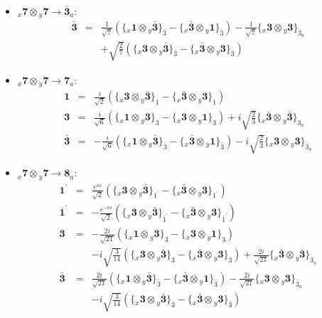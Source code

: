 \documentclass[english]{article}
\newcommand{\rep}[1]{\mathbf{#1}}
\newcommand{\repx}[2]{{}_{#2}\mathbf{#1}}
\newcommand{\subcg}[3]{\big\{ \repx{#1}{x}\otimes\repx{#2}{y}\big\}^{}_{#3}}
\begin{document}
\begin{itemize}
\begin{eqnarray*}
\end{eqnarray*}
\item $\repx{7}{x}\otimes\repx{7}{y}\to\rep{\bar{3}}_{a}$:
\begin{eqnarray*}
\rep{\bar{3}} &=& \frac{1}{\sqrt{7}}\left(\subcg{1}{\bar{3}}{\bar{3}}-\subcg{\bar{3}}{1}{\bar{3}}\right)-\frac{1}{\sqrt{7}}\subcg{3}{3}{\bar{3}_{a}} \\ 
 & & +\sqrt{\frac{2}{7}}\left(\subcg{3}{\bar{3}}{\bar{3}}-\subcg{\bar{3}}{3}{\bar{3}}\right)
\end{eqnarray*}
\item $\repx{7}{x}\otimes\repx{7}{y}\to\rep{7}_{a}$:
\begin{eqnarray*}
\rep{1} &=& \frac{i}{\sqrt{2}}\left(\subcg{3}{\bar{3}}{1}-\subcg{\bar{3}}{3}{1}\right)
\\
\rep{3} &=& \frac{i}{\sqrt{6}}\left(\subcg{1}{3}{3}-\subcg{3}{1}{3}\right)+i \sqrt{\frac{2}{3}}\subcg{\bar{3}}{\bar{3}}{3_{a}}
\\
\rep{\bar{3}} &=& -\frac{i}{\sqrt{6}}\left(\subcg{1}{\bar{3}}{\bar{3}}-\subcg{\bar{3}}{1}{\bar{3}}\right)-i \sqrt{\frac{2}{3}}\subcg{3}{3}{\bar{3}_{a}}
\end{eqnarray*}
\item $\repx{7}{x}\otimes\repx{7}{y}\to\rep{8}_{a}$:
\begin{eqnarray*}
\rep{1^{\prime}} &=& \frac{e^{i \alpha }}{\sqrt{2}}\left(\subcg{3}{\bar{3}}{1^{\prime}}-\subcg{\bar{3}}{3}{1^{\prime}}\right)
\\
\rep{\bar{1}^{\prime}} &=& -\frac{e^{-i \alpha }}{\sqrt{2}}\left(\subcg{3}{\bar{3}}{\bar{1}^{\prime}}-\subcg{\bar{3}}{3}{\bar{1}^{\prime}}\right)
\\
\rep{3} &=& -\frac{2 i}{\sqrt{21}}\left(\subcg{1}{3}{3}-\subcg{3}{1}{3}\right) \\ 
 & & -i \sqrt{\frac{3}{14}}\left(\subcg{3}{\bar{3}}{3}-\subcg{\bar{3}}{3}{3}\right)+\frac{2 i}{\sqrt{21}}\subcg{\bar{3}}{\bar{3}}{3_{a}}
\\
\rep{\bar{3}} &=& \frac{2 i}{\sqrt{21}}\left(\subcg{1}{\bar{3}}{\bar{3}}-\subcg{\bar{3}}{1}{\bar{3}}\right)-\frac{2 i}{\sqrt{21}}\subcg{3}{3}{\bar{3}_{a}} \\ 
 & & -i \sqrt{\frac{3}{14}}\left(\subcg{3}{\bar{3}}{\bar{3}}-\subcg{\bar{3}}{3}{\bar{3}}\right)
\end{eqnarray*}
\end{itemize}
\end{document}
